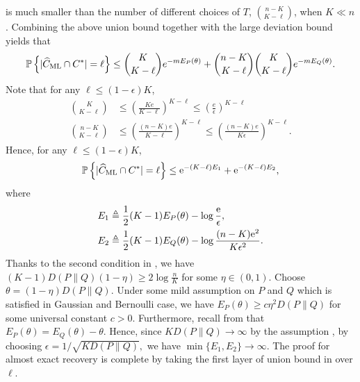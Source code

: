 is much smaller than the number of different choices of $T$, $\binom{n-K}{K-\ell}$, when $K\ll n$. 
Combining the above union bound together with the large deviation bound  
yields that 
\begin{align}
\mathbb{P}\left\{  | \widehat{C}_{\rm ML}  \cap C^* | =\ell \right\} \le   \binom{K}{K-\ell} e^{- m E_P(\theta)}  + \binom{n-K}{K-\ell} \binom{K}{K-\ell} e^{- m E_Q(\theta)}. 
\label{eq:MLE_tail_analysis}
\end{align}
Note that for any $\ell \leq (1-\epsilon)K$,
\begin{align*}
 \binom{K}{K-\ell} & \le \left( \frac{K e }{K-\ell}  \right) ^{K-\ell} \le \left( \frac{e}{\epsilon} \right)^{K-\ell} \\
  \binom{n-K}{K-\ell} & \le  \left( \frac{ (n-K) e }{K-\ell}  \right) ^{K-\ell} \le  \left( \frac{(n-K) e}{K \epsilon} \right)^{K-\ell}.
\end{align*}
Hence, for  any $\ell \leq (1-\epsilon)K$,
\begin{align}
\mathbb{P}\left\{  | \widehat{C}_{\rm ML}  \cap C^* | =\ell \right\}  \le {\rm e}^{-(K-\ell) E_1} + {\rm e}^{-(K-\ell) E_2}, \label{eq:weakProbupperbound}
\end{align}
where
\begin{align*}
E_1 &\triangleq \frac{1}{2} (K-1) E_P(\theta)  - \log \frac{{\rm e}}{\epsilon} , \\
E_2 &\triangleq \frac{1}{2} (K-1) E_Q(\theta)   - \log \frac{(n-K) {\rm e}^2}{K \epsilon^2}.
\end{align*}
Thanks to the second condition in , 
we have $(K-1)  D(P\|Q) (1-\eta) \geq 2  \log \frac{n}{K}$ for some $\eta \in (0,1)$. 
Choose $\theta = (1-\eta) D(P\|Q)$. Under some mild assumption on $P$ and $Q$ which is
satisfied in Gaussian and Bernoulli case, we have $E_P(\theta)  \geq c \eta^2 D(P\|Q)$ for
some universal constant $c>0$. Furthermore, recall from  that $E_P(\theta)= E_Q(\theta) - \theta$. 
Hence, since $K  D(P\|Q) \to \infty $ by the assumption , by choosing $\epsilon= 1/\sqrt{KD(P\|Q)},$
we have $\min\{ E_1, E_2 \} \to \infty$. The proof for almost exact recovery is complete by
taking the first layer of union bound in  over $\ell$. \\

